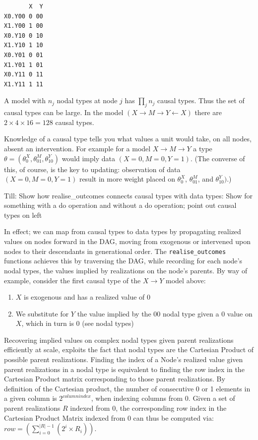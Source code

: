 \documentclass[
  article]{jss}
\providecommand{\tightlist}{%
  \setlength{\itemsep}{0pt}\setlength{\parskip}{0pt}}\usepackage{longtable,booktabs,array}
\begin{document}
\begin{verbatim}
       X  Y
X0.Y00 0 00
X1.Y00 1 00
X0.Y10 0 10
X1.Y10 1 10
X0.Y01 0 01
X1.Y01 1 01
X0.Y11 0 11
X1.Y11 1 11
\end{verbatim}

A model with \(n_j\) nodal types at node \(j\) has \(\prod_jn_j\) causal
types. Thus the set of causal types can be large. In the model
\((X\rightarrow M \rightarrow Y \leftarrow X)\) there are
\(2\times 4\times 16 = 128\) causal types.

Knowledge of a causal type tells you what values a unit would take, on
all nodes, absent an intervention. For example for a model
\(X \rightarrow M \rightarrow Y\) a type
\(\theta = (\theta^X_0, \theta^M_{01}, \theta^Y_{10})\) would imply data
\((X=0, M=0, Y=1)\). (The converse of this, of course, is the key to
updating: observation of data \((X=0, M=0, Y=1)\) result in more weight
placed on \(\theta^X_0\), \(\theta^M_{01}\), and \(\theta^Y_{10})\).)

Till: Show how realise\_outcomes connects causal types with data types:
Show for something with a do operation and without a do operation; point
out causal types on left

In effect; we can map from causal types to data types by propagating
realized values on nodes forward in the DAG, moving from exogenous or
intervened upon nodes to their descendants in generational order. The
\texttt{realise\_outcomes} functions achieves this by traversing the
DAG, while recording for each node's nodal types, the values implied by
realizations on the node's parents. By way of example, consider the
first causal type of the \(X \rightarrow Y\) model above:

\begin{enumerate}
\def\labelenumi{\arabic{enumi}.}
\tightlist
\item
  \(X\) is exogenous and has a realized value of \(0\)
\item
  We substitute for \(Y\) the value implied by the \(00\) nodal type
  given a \(0\) value on \(X\), which in turn is \(0\) (see nodal types)
\end{enumerate}

Recovering implied values on complex nodal types given parent
realizations efficiently at scale, exploits the fact that nodal types
are the Cartesian Product of possible parent realizations. Finding the
index of a Node's realized value given parent realizations in a nodal
type is equivalent to finding the row index in the Cartesian Product
matrix corresponding to those parent realizations. By definition of the
Cartesian product, the number of consecutive 0 or 1 elements in a given
column is \(2^{columnindex}\), when indexing columns from 0. Given a set
of parent realizations \(R\) indexed from 0, the corresponding row index
in the Cartesian Product Matrix indexed from 0 can thus be computed via:
\(row = (\sum_{i = 0}^{|R| - 1} (2^{i} \times R_i))\).
\end{document}
